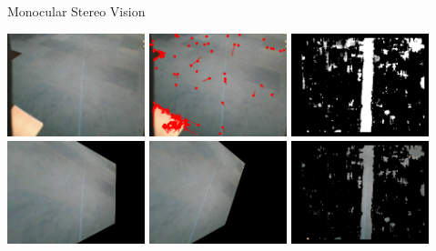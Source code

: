 \documentclass{beamer}
\begin{document}
\begin{frame}
\begin{block}{Monocular Stereo Vision}
\begin{center}
\includegraphics[width=0.3\textwidth]{images/stereo_image.png}
\includegraphics[width=0.3\textwidth]{images/stereo_optical_flow.png}
\includegraphics[width=0.3\textwidth]{images/stereo_disparity.png}\\
\includegraphics[width=0.3\textwidth]{images/stereo_left.png}
\includegraphics[width=0.3\textwidth]{images/stereo_right.png}
\includegraphics[width=0.3\textwidth]{images/stereo_disparity_cut.png}
\end{center}
\end{block}
\end{frame}
\end{document}
